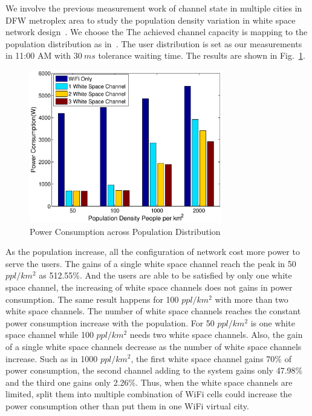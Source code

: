 We involve the previous measurement work of channel state in multiple cities in DFW metroplex area to study the 
population density variation in white space network design~\cite{pcuiwinmee}.
We choose the 
The achieved channel capacity is mapping to the population distribution as in~\cite{pcuiwinmee}. The user 
distribution is set as our measurements in 11:00 AM with $30\ ms$ tolerance waiting time.
The results are shown in Fig.~\ref{fig:populationvary}.

\begin{figure}[hpt]
\vspace{-0.0in}
\centering
\includegraphics[width=84mm]{figures/populationvary}
\vspace{-0.1in}
\caption{Power Consumption across Population Distribution}
\label{fig:populationvary}
\vspace{-0.1in}
\end{figure}

As the population increase, all the configuration of network cost more power to serve the users.
The gains of a single white space channel reach the peak in 50 $ppl/km^2$ as 512.55\%. 
And the users are able to be satisfied by only one white space channel, the increasing of white space 
channels does not gains in power consumption. The same result happens for 100 $ppl/km^2$ with more than 
two white space channels. The number of white space channels reaches the constant power consumption 
increase with the population. For 50 $ppl/km^2$ is one white space channel while 100 $ppl/km^2$ needs two 
white space channels. Also, the gain of a single white space channels decrease as the number of white space 
channels increase. Such as in 1000 $ppl/km^2$, the first white space channel gains 70\% of power consumption, 
the second channel adding to the system gains only 47.98\% and the third one gains only 2.26\%.  
Thus, when the white space channels are limited, split them into multiple combination of WiFi cells 
could increase the power consumption other than put them in one WiFi virtual city.






